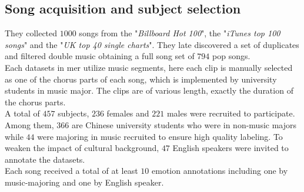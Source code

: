 \subsection{Song acquisition and subject selection}
They collected $1000$ songs from the "\textit{Billboard Hot 100}", the "\textit{iTunes top 100 songs}" and the "\textit{UK top 40 single charts}". They late discovered a set of duplicates and filtered double music obtaining a full song set of $794$ pop songs.
\\
Each datasets in \gls{mer} utilize music segments, here each clip is manually selected as one of the chorus parts of each song, which is implemented by university students in music major. The clips are of various length, exactly the duration of the chorus parts.
\\ \indent
A total of $457$ subjects, $236$ females and $221$ males were recruited to participate. Among them, $366$ are Chinese university students who were in non-music majors while $44$ were majoring in music recruited to ensure high quality labeling. To weaken the impact of cultural background, $47$ English speakers were invited to annotate the datasets.
\\
Each song received a total of at least $10$ emotion annotations including one by music-majoring and one by English speaker.

